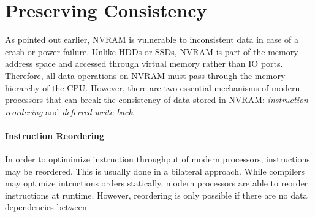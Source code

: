 

\section{Preserving Consistency}

As pointed out earlier, \ac{NVRAM} is vulnerable to inconsistent data in case of
a crash or power failure. Unlike \acp{HDD} or \acp{SSD}, \acl{NVRAM} is part of
the memory address space and accessed through virtual memory rather than IO
ports. Therefore, all data operations on \ac{NVRAM} must pass through the memory
hierarchy of the \ac{CPU}. However, there are two essential mechanisms of modern
processors that can break the consistency of data stored in \ac{NVRAM}:
\emph{instruction reordering} and \emph{deferred write-back}.


\paragraph{Instruction Reordering}


In order to optimimize instruction throughput of modern processors, instructions may be reordered. This is usually done in a bilateral approach. While compilers may optimize intructions orders statically, modern processors are able to reorder instructions at runtime. However, reordering is only possible if there are no data dependencies between


